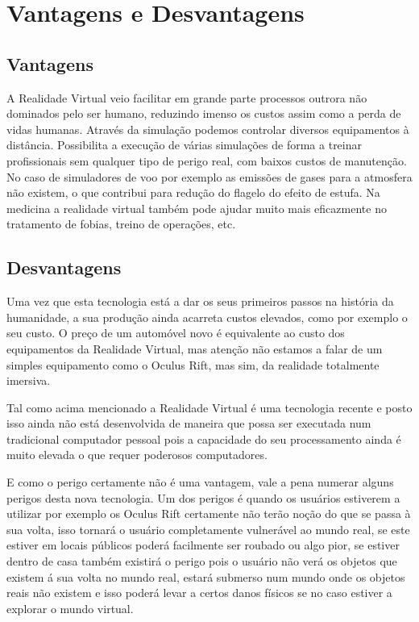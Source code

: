 \chapter{Vantagens e Desvantagens}

\section{Vantagens}

A Realidade Virtual  veio facilitar em grande parte processos outrora não dominados pelo ser humano, reduzindo imenso os custos assim como a perda de vidas humanas. 
Através da simulação podemos controlar diversos equipamentos à distância. 
Possibilita a execução de várias simulações de forma a treinar profissionais sem qualquer tipo de perigo real, com baixos custos de manutenção. No caso de simuladores de voo por exemplo as emissões de gases para a atmosfera não existem, o que contribui para redução do flagelo do efeito de estufa.
Na medicina a realidade virtual também pode ajudar muito mais eficazmente no tratamento de fobias, treino de operações, etc.


\section{Desvantagens}

Uma vez que esta tecnologia está a dar os seus primeiros passos na história da humanidade, a sua produção ainda acarreta custos elevados, como por exemplo o seu custo. O preço de um automóvel novo é equivalente ao custo dos equipamentos da Realidade Virtual, mas atenção não estamos a falar de um simples equipamento como o Oculus Rift, mas sim, da realidade totalmente imersiva. 

Tal como acima mencionado a Realidade Virtual é uma tecnologia recente e posto isso ainda não está desenvolvida de maneira que possa ser executada num tradicional computador pessoal pois a capacidade do seu processamento ainda é muito elevada o que requer poderosos computadores.

E como o perigo certamente não é uma vantagem, vale a pena numerar alguns perigos desta nova tecnologia. Um dos perigos é quando os usuários estiverem a utilizar por exemplo os Oculus Rift certamente não terão noção do que se passa à sua volta, isso tornará o usuário completamente vulnerável ao mundo real, se este estiver em locais públicos poderá facilmente ser roubado ou algo pior, se estiver dentro de casa também existirá o perigo pois o usuário não verá os objetos que existem á sua volta no mundo real, estará submerso num mundo onde os objetos reais não existem e isso poderá levar a certos danos físicos se no caso estiver a explorar o mundo virtual.




